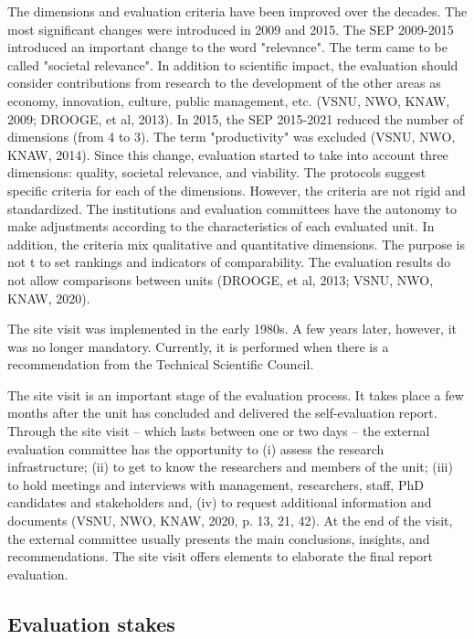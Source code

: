 The dimensions and evaluation criteria have been improved over the decades. The most significant changes were introduced in 2009 and 2015. The SEP 2009-2015 introduced an important change to the word "relevance". The term came to be called "societal relevance". In addition to scientific impact, the evaluation should consider contributions from research to the development of the other areas as economy, innovation, culture, public management, etc. (VSNU, NWO, KNAW, 2009; DROOGE, et al, 2013). In 2015, the SEP 2015-2021 reduced the number of dimensions 
(from 4 to 3). The term "productivity" was excluded (VSNU, NWO, KNAW, 2014). Since this change, evaluation started to take into account three dimensions: quality, societal relevance, and viability. The protocols suggest specific criteria for each of the dimensions. However, the criteria are not rigid and standardized. The institutions and evaluation committees have the autonomy to make adjustments according to the characteristics of each evaluated unit. In addition, the criteria mix qualitative and quantitative dimensions. The purpose is not t to set rankings and indicators of comparability. The evaluation results do not allow comparisons between units (DROOGE, et al, 2013; VSNU, NWO, KNAW, 2020). 

The site visit was implemented in the early 1980s. A few years later, however, it was no longer mandatory. Currently, it is performed when there is a recommendation from the Technical Scientific 
Council.   

The site visit is an important stage of the evaluation process. It takes place a few months after the unit has concluded and delivered the self-evaluation report. Through the site visit – which lasts between one or two days – the external evaluation committee has the opportunity to (i) assess the research infrastructure; (ii) to get to know the researchers and members of the unit; (iii) to hold meetings and interviews with management, researchers, staff, PhD candidates and stakeholders and, (iv) to request additional information and documents (VSNU, NWO, KNAW, 2020, p. 13, 21, 42). At the end of the visit, the external committee usually presents the main conclusions, insights, and recommendations. The site visit offers elements to elaborate the final report evaluation. 

\subsection{Evaluation stakes}
\label{subsec:comp_evaluation:funding}

